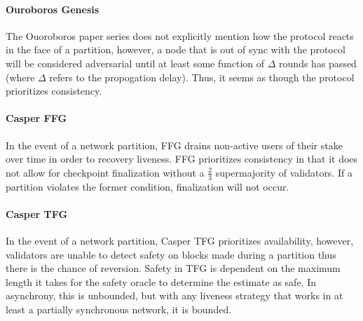 \documentclass[10pt,journal,compsoc]{IEEEtran}
\begin{document}
\paragraph{Ouroboros Genesis} The Ouoroboros paper series does not explicitly mention how the protocol reacts in the face of a partition, however, a node that is out of sync with the protocol will be considered adversarial until at least some function of $\Delta$ rounds has passed (where $\Delta$ refers to the propogation delay). Thus, it seems as though the protocol prioritizes consistency. 

\paragraph{Casper FFG} In the event of a network partition, FFG drains non-active users of their stake over time in order to recovery liveness. FFG prioritizes consistency in that it does not allow for checkpoint finalization without a \(\frac{2}{3}\) supermajority of validators. If a partition violates the former condition, finalization will not occur. 

\paragraph{Casper TFG} In the event of a network partition, Casper TFG prioritizes availability, however, validators are unable to detect safety on blocks made during a partition thus there is the chance of reversion. Safety in TFG is dependent on the maximum length it takes for the safety oracle to determine the estimate as safe. In asynchrony, this is unbounded, but with any liveness strategy that works in at least a partially synchronous network, it is bounded.      
%
%
\end{document}

